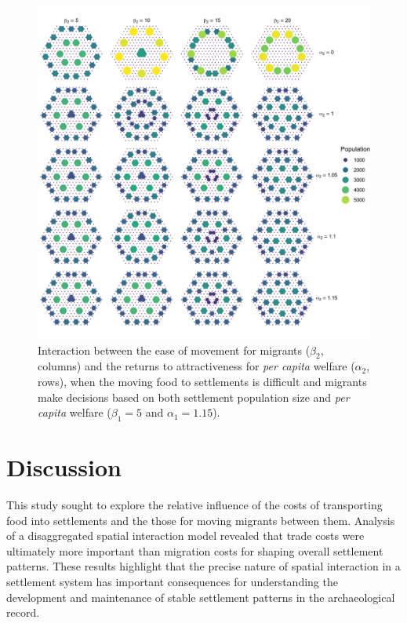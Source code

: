 \documentclass{article}
\begin{document}
\begin{figure}
    \centering
    \includegraphics[width = \linewidth]{images/beta2alpha2.png}
    \caption[Interaction between the ease of movement for migrants ($\beta_2$, columns) and the returns to attractiveness for per capita welfare ($\alpha_2$, rows)]{Interaction between the ease of movement for migrants ($\beta_2$, columns) and the returns to attractiveness for \emph{per capita} welfare ($\alpha_2$, rows), when the moving food to settlements is difficult and migrants make decisions based on both settlement population size and \emph{per capita} welfare ($\beta_1 = 5$ and $\alpha_1 = 1.15$).}
    \label{fig:beta2alpha2}
    
\end{figure}

\section{Discussion}

This study sought to explore the relative influence of the costs of transporting food into settlements and the those for moving migrants between them. Analysis of a disaggregated spatial interaction model revealed that trade costs were ultimately more important than migration costs for shaping overall settlement patterns. These results highlight that the precise nature of spatial interaction in a settlement system has important consequences for understanding the development and maintenance of stable settlement patterns in the archaeological record.
\end{document}
